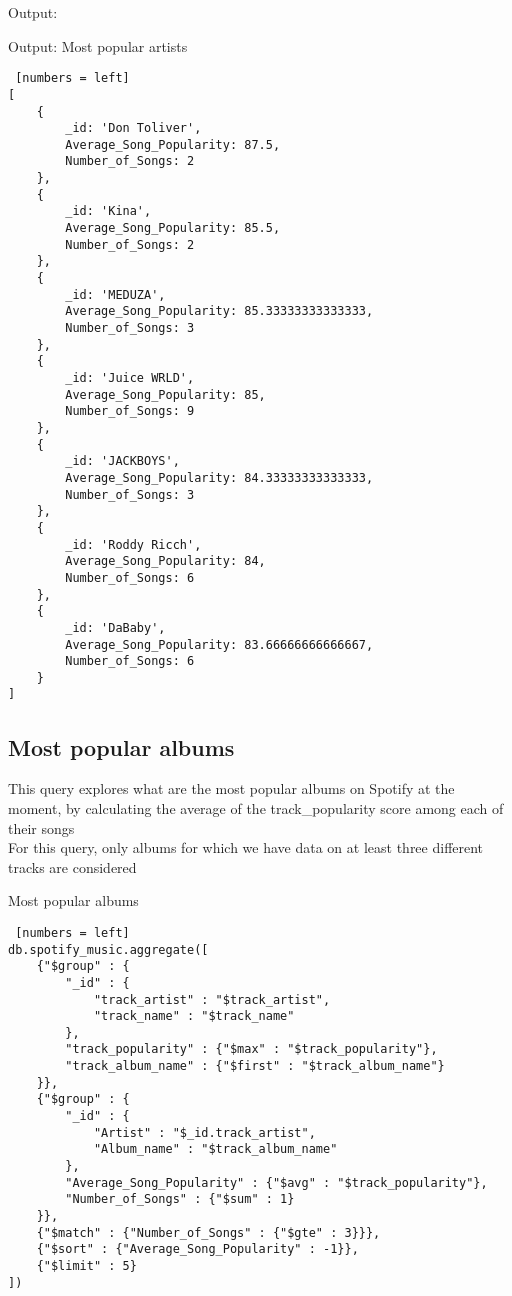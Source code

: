 \documentclass{Configuration_Files/PoliMi3i_thesis}
\begin{document}
Output:
\begin{algorithm}[h!]
\caption{Output: Most popular artists}
\begin{lstlisting} [numbers = left]
[
	{
		_id: 'Don Toliver',
		Average_Song_Popularity: 87.5,
		Number_of_Songs: 2
	},
	{
		_id: 'Kina',
		Average_Song_Popularity: 85.5,
		Number_of_Songs: 2 
	},
	{
		_id: 'MEDUZA',
		Average_Song_Popularity: 85.33333333333333,
		Number_of_Songs: 3
	},
	{
		_id: 'Juice WRLD',
		Average_Song_Popularity: 85,
		Number_of_Songs: 9
	},
	{
		_id: 'JACKBOYS',
		Average_Song_Popularity: 84.33333333333333,
		Number_of_Songs: 3
	},
	{
		_id: 'Roddy Ricch',
		Average_Song_Popularity: 84,
		Number_of_Songs: 6
	},
	{
		_id: 'DaBaby',
		Average_Song_Popularity: 83.66666666666667,
		Number_of_Songs: 6
	}
]
\end{lstlisting}
\end{algorithm}
\newpage

\subsection{Most popular albums}
This query explores what are the most popular albums on Spotify at the moment, by calculating the average of the track\_popularity score among each of their songs\\
For this query, only albums for which we have data on at least three different tracks are considered
\begin{algorithm}[ht]
\caption{Most popular albums}
\begin{lstlisting} [numbers = left]
db.spotify_music.aggregate([
	{"$group" : {
		"_id" : {
			"track_artist" : "$track_artist",
			"track_name" : "$track_name"
		},
		"track_popularity" : {"$max" : "$track_popularity"},
		"track_album_name" : {"$first" : "$track_album_name"}
	}},
	{"$group" : {
		"_id" : {
			"Artist" : "$_id.track_artist",
			"Album_name" : "$track_album_name"
		},
		"Average_Song_Popularity" : {"$avg" : "$track_popularity"},
		"Number_of_Songs" : {"$sum" : 1}
	}},
	{"$match" : {"Number_of_Songs" : {"$gte" : 3}}},
	{"$sort" : {"Average_Song_Popularity" : -1}},
	{"$limit" : 5}
])
\end{lstlisting}
\end{algorithm}
\newpage
\end{document}

